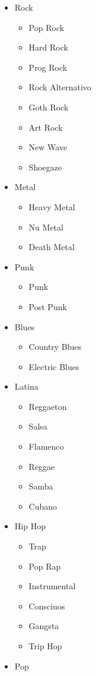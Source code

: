 \begin{itemize}
\itemsep0em
\item
  Rock
  \begin{itemize}
  \item
    Pop Rock
  \item
    Hard Rock
  \item
    Prog Rock
  \item
    Rock Alternativo
  \item
    Goth Rock
  \item
    Art Rock
  \item
    New Wave
  \item
    Shoegaze
  \end{itemize}
\item
  Metal

  \begin{itemize}
  \item
    Heavy Metal
  \item
    Nu Metal
  \item
    Death Metal
  \end{itemize}
\item
  Punk

  \begin{itemize}
  \item
    Punk
  \item
    Post Punk
  \end{itemize}
\item
  Blues

  \begin{itemize}
  \item
    Country Blues
  \item
    Electric Blues
  \end{itemize}
\item
  Latina

  \begin{itemize}
  \item
    Reggaeton
  \item
    Salsa
  \item
    Flamenco
  \item
    Reggae
  \item
    Samba
  \item
    Cubano
  \end{itemize}
\item
  Hip Hop

  \begin{itemize}
  \item
    Trap
  \item
    Pop Rap
  \item
    Instrumental
  \item
    Consciuos
  \item
    Gangsta
  \item
    Trip Hop
  \end{itemize}
\item
  Pop


\end{itemize}
